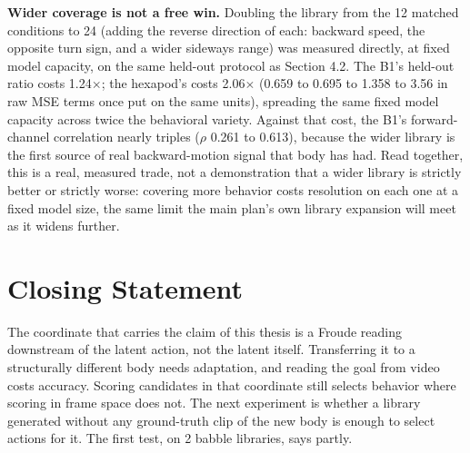 \documentclass[12pt,a4paper,oneside]{report}
\begin{document}
\noindent\textbf{Wider coverage is not a free win.} Doubling the library from the 12 matched conditions to 24 (adding
the reverse direction of each: backward speed, the opposite turn sign, and a wider sideways range) was measured
directly, at fixed model capacity, on the same held-out protocol as Section 4.2. The B1's held-out ratio costs
1.24$\times$; the hexapod's costs 2.06$\times$ (0.659 to 0.695 to 1.358 to 3.56 in raw MSE terms once put on the same
units), spreading the same fixed model capacity across twice the behavioral variety. Against that cost, the B1's
forward-channel correlation nearly triples ($\rho$ 0.261 to 0.613), because the wider library is the first source of
real backward-motion signal that body has had. Read together, this is a real, measured trade, not a demonstration
that a wider library is strictly better or strictly worse: covering more behavior costs resolution on each one at a
fixed model size, the same limit the main plan's own library expansion will meet as it widens further.

\section{Closing Statement}
The coordinate that carries the claim of this thesis is a Froude reading downstream of the latent action, not the latent
itself. Transferring it to a structurally different body needs adaptation, and reading the goal from video costs
accuracy. Scoring candidates in that coordinate still selects behavior where scoring in frame space does not. The next
experiment is whether a library generated without any ground-truth clip of the new body is enough to select actions
for it. The first test, on 2 babble libraries, says partly.

\end{document}
